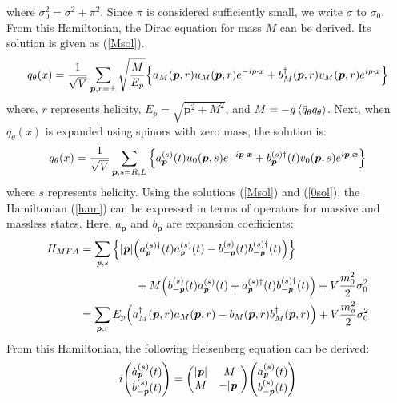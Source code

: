         where $\sigma_0^2 = \sigma^2 + \pi^2$. Since $\pi$ is considered sufficiently small, we write $\sigma$ to $\sigma_0$.  
        From this Hamiltonian, the Dirac equation for mass $M$ can be derived. Its solution is given as (\ref{Msol}). 
        \begin{eqnarray}
            \label{Msol}
            q_\theta (x)=\frac{1}{\sqrt{V}}\sum_{\bm{p},r=\pm} \sqrt{\frac{M}{E_p}}\qty{a_M(\bm{p},r)u_M(\bm{p},r)e^{-ip\cdot x}+b_M^{\dag}(\bm{p},r)v_M(\bm{p},r)e^{ip\cdot x}}
        \end{eqnarray}
        where, $r$ represents helicity, $E_p = \sqrt{\bm{p}^2 + M^2}$, and $M = -g\ev{\bar{q}_\theta q_\theta}$.  
        Next, when $q_\theta(x)$ is expanded using spinors with zero mass, the solution is:  
        \begin{eqnarray}
            \label{0sol}
            q_\theta (x)=\frac{1}{\sqrt{V}}\sum_{\bm{p},s=R,L}\qty{a_{\bm{p}}^{(s)}(t)u_0(\bm{p},s)e^{-i\bm{p}\cdot \bm{x}}+b_{\bm{p}}^{(s)\dag}(t)v_0(\bm{p},s)e^{i\bm{p}\cdot \bm{x}}}
        \end{eqnarray}
        where $s$ represents helicity.  
        Using the solutions (\ref{Msol}) and (\ref{0sol}), the Hamiltonian (\ref{ham}) can be expressed in terms of operators for massive and massless states. Here, $a_{\bm{p}}$ and $b_{\bm{p}}$ are expansion coefficients:  
        \begin{align}
            \label{hamenzan}
            H_{MFA} &= \sum_{\textbf{\textit{p}},s} 
            \qty{|\textbf{\textit{p}}| 
            \qty(a_{\textbf{\textit{p}}}^{(s)\dag}(t) a_{\textbf{\textit{p}}}^{(s)}(t) 
            - b_{-\textbf{\textit{p}}}^{(s)}(t)b_{-\textbf{\textit{p}}}^{(s)\dag}(t))} \notag \\
            &\hspace{5em} + M \qty(b_{-\textbf{\textit{p}}}^{(s)}(t)a_{\textbf{\textit{p}}}^{(s)}(t) 
            + a_{\textbf{\textit{p}}}^{(s)\dag}(t) b_{-\textbf{\textit{p}}}^{(s)\dag}(t)) 
            + V \frac{m_0^2}{2} \sigma_0^2 \\
            \label{massfinite}
            &= \sum_{\bm{p},r} E_p 
            \qty(a^\dagger_M(\bm{p},r)a_M(\bm{p},r) 
            - b_M(\bm{p},r)b^\dagger_M(\bm{p},r)) 
            + V \frac{m_o^2}{2} \sigma_0^2
        \end{align}
        From this Hamiltonian, the following Heisenberg equation can be derived:  
        \begin{eqnarray}
            \label{massless_Heisenberg_e.q.}
            i \mqty(\dot{a}_{\textbf{\textit{p}}}^{(s)}(t)\\\dot{b}_{-\textbf{\textit{p}}}^{(s)}(t))=\mqty(|\textbf{\textit{p}}|&M\\M&-|\textbf{\textit{p}}|)\mqty(a_{\textbf{\textit{p}}}^{(s)}(t)\\b_{-\textbf{\textit{p}}}^{(s)}(t))
        \end{eqnarray}
